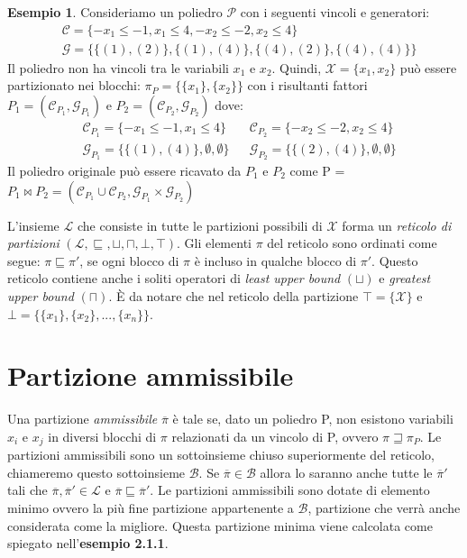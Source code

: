 \documentclass{mimosis}
\theoremstyle{definition}
\newtheorem{exmp}{Esempio}[section]
\begin{document}
\begin{exmp}
  Consideriamo un poliedro $\mathcal{P}$ con i seguenti vincoli e generatori:
  \begin{align*}
    &\mathcal{C} = \{-x_{1} \le -1, x_{1} \le 4, -x_{2} \le -2, x_{2} \le 4\} \\
    &\mathcal{G} = \{\{(1),(2)\}, \{(1),(4)\}, \{(4),(2)\}, \{(4),(4)\}\}
  \end{align*}
  Il poliedro non ha vincoli tra le variabili $x_1$ e $x_2$. Quindi, $\mathcal{X} = \{x_1,x_2\}$
  può essere partizionato nei blocchi: $\pi_P = \{\{x_1\}, \{x_2\}\}$ con i risultanti fattori
  $P_1 = (\mathcal{C}_{P_1}, \mathcal{G}_{P_1})$ e $P_2 = (\mathcal{C}_{P_2}, \mathcal{G}_{P_2})$ dove:
  \begin{align*}
      &\mathcal{C}_{P_{1}} = \{-x_{1} \le -1, x_{1} \le 4\}  &&\mathcal{C}_{P_{2}} = \{ -x_{2} \le -2, x_{2} \le 4\} \\
      &\mathcal{G}_{P_{1}} = \{\{(1),(4)\}, \emptyset, \emptyset \} &&\mathcal{G}_{P_{2}} = \{\{(2),(4)\}, \emptyset, \emptyset \}
  \end{align*}
  Il poliedro originale può essere ricavato da $P_{1}$ e $P_{2}$ come
  P = $P_{1} \bowtie P_{2} = (\mathcal{C}_{P_{1}} \cup \mathcal{C}_{P_{2}}, \mathcal{G}_{P_{1}} \times \mathcal{G}_{P_{2}})$
\end{exmp}

L'insieme \(\mathcal{L}\) che consiste in tutte le partizioni possibili di \(\mathcal{X}\)
forma un \emph{reticolo di partizioni} \((\mathcal{L}, \sqsubseteq, \sqcup, \sqcap,
\bot, \top)\). Gli elementi \(\pi\) del reticolo sono ordinati come segue: \(\pi
\sqsubseteq \pi'\), se ogni blocco di \(\pi\) è incluso in qualche blocco di
\(\pi'\). Questo reticolo contiene anche i soliti operatori di \emph{least upper bound}
\((\sqcup)\) e \emph{greatest upper bound} \((\sqcap)\). È da notare che nel reticolo della
partizione \(\top = \{\mathcal{X}\}\) e \(\bot = \{\{x_1\}, \{x_2\}, ..., \{x_n\}\}\).

\section{Partizione ammissibile}
\label{sec:orgd38bc62}
Una partizione \emph{ammissibile} \(\overline{\pi}\) è tale se, dato un poliedro P, non esistono
variabili \(x_i\) e \(x_j\) in diversi blocchi di \(\pi\) relazionati da un vincolo di
P, ovvero \(\pi \sqsupseteq \pi_P\). Le partizioni ammissibili sono un
sottoinsieme chiuso superiormente del reticolo, chiameremo questo sottoinsieme
\(\mathcal{B}\). Se \(\overline{\pi} \in \mathcal{B}\) allora lo saranno anche tutte
le \(\overline{\pi}'\) tali che \(\overline{\pi}, \overline{\pi}' \in \mathcal{L}\) e
\(\overline{\pi} \sqsubseteq \overline{\pi}'\). Le partizioni ammissibili sono
dotate di elemento minimo ovvero la più fine partizione appartenente a
\(\mathcal{B}\), partizione che verrà anche considerata come la migliore. Questa
partizione minima viene calcolata come spiegato nell'\textbf{esempio 2.1.1}.
\end{document}
